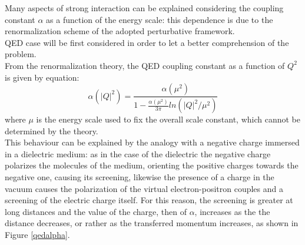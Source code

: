 Many aspects of strong interaction can be explained considering the coupling constant $\alpha$ as a function of the energy scale: this dependence is due to the renormalization scheme of the adopted perturbative framework.\\
QED case will be first considered in order to let a better comprehension of the problem.\\
From the renormalization theory, the QED coupling constant as a function of $Q^{2}$ is given by equation:
%
\begin{equation}
  \alpha(|Q|^{2})= \frac{ \alpha(\mu^{2})}{1-\frac{\alpha(\mu^{2})}{3\pi}ln(|Q|^{2} / \mu^{2})}
  \label{eq:aqed}
\end{equation}
%
where $\mu$ is the energy scale used to fix the overall scale constant, which cannot be determined by the theory.\\
This behaviour can be explained by the analogy with a negative charge immersed in a dielectric medium: as in the case of the dielectric the negative charge polarizes the molecules of the medium, orienting the positive charges towards the negative one, causing its screening, likewise the presence of a charge in the vacuum causes the polarization of the virtual electron-positron couples and a screening of the electric charge itself. For this reason, the screening is greater at long distances and the value of the charge, then of $\alpha$, increases as the the distance decreases, or rather as the transferred momentum increases, as shown in Figure \ref{qedalpha}.
%
